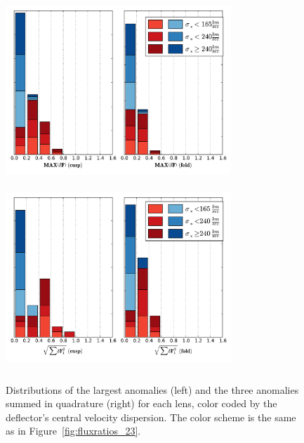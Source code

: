 \begin{figure}
	{\includegraphics[trim=0cm 0cm 0cm .3cm,clip,width=8.5cm, height=6.85cm]{./figures_sls/maxanomaly_disrebinsmooth-eps-converted-to.pdf}}
	{\includegraphics[trim=0cm 0.2cm 0cm 0cm,clip,width=8.5cm, height=7cm]{./figures_sls/sumquad_disrebinsmooth-eps-converted-to.pdf}}
	\caption{\label{fig:distribution_23}Distributions of the largest anomalies (left) and the three anomalies summed in quadrature (right) for each lens, color coded by the deflector's central velocity dispersion. The color scheme is the same as in Figure~\ref{fig:fluxratios_23}.}
\end{figure} 
